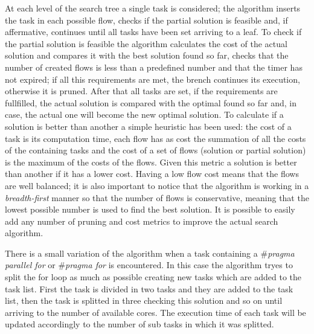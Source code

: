 \documentclass[a4paper,12pt,oneside]{book}
\begin{document}
At each level of the search tree a single task is considered; the algorithm inserts the task in each possible flow, checks if the partial solution is feasible and, if affermative, continues until all tasks have been set arriving to a leaf. To check if the partial solution is feasible the algorithm calculates the cost of the actual solution and compares it with the best solution found so far, checks that the number of created flows is less than a predefined number and that the timer has not expired; if all this requirements are met, the brench continues its execution, otherwise it is pruned. After that all tasks are set, if the requirements are fullfilled, the actual solution is compared with the optimal found so far and, in case, the actual one will become the new optimal solution. To calculate if a solution is better than another a simple heuristic has been used: the cost of a task is its computation time, each flow has as cost the summation of all the costs of the containing tasks and the cost of a set of flows (solution or partial solution) is the maximum of the costs of the flows. Given this metric a solution is better than another if it has a lower cost. Having a low flow cost means that the flows are well balanced; it is also important to notice that the algorithm is working in a \emph{breadth-first} manner so that the number of flows is conservative, meaning that the lowest possible number is used to find the best solution. It is possible to easily add any number of pruning and cost metrics to improve the actual search algorithm.

There is a small variation of the algorithm when a task containing a \emph{$\#$pragma parallel for} or \emph{$\#$pragma for} is encountered. In this case the algorithm tryes to split the for loop as much as possible creating new tasks which are added to the task list. First the task is divided in two tasks and they are added to the task list, then the task is splitted in three checking this solution and so on until arriving to the number of available cores. The execution time of each task will be updated accordingly to the number of sub tasks in which it was splitted. 
\end{document}
